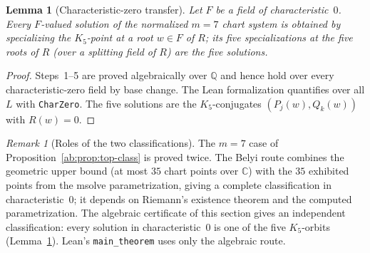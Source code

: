 \documentclass[a4paper,11pt]{article}
\theoremstyle{plain}
\newtheorem{lemma}[theorem]{Lemma}
\theoremstyle{definition}
\theoremstyle{remark}
\newtheorem{remark}[theorem]{Remark}
\begin{document}
\begin{lemma}[Characteristic-zero transfer]\label{ab:lem:chart-transfer}
Let $F$ be a field of characteristic~$0$. Every $F$-valued solution of the normalized $m=7$ chart system is obtained by specializing the $K_5$-point at a root $w\in F$ of $R$; its five specializations at the five roots of $R$ (over a splitting field of $R$) are the five solutions.
\end{lemma}
\begin{proof}
Steps~1--5 are proved algebraically over $\mathbb{Q}$ and hence hold over every characteristic-zero field by base change. The Lean formalization quantifies over all $L$ with \texttt{CharZero}. The five solutions are the $K_5$-conjugates $(P_j(w),Q_k(w))$ with $R(w)=0$.
\end{proof}

\begin{remark}[Roles of the two classifications]
The $m=7$ case of Proposition~\ref{ab:prop:top-class} is proved twice. The Belyi route combines the geometric upper bound (at most $35$ chart points over $\mathbb{C}$) with the $35$ exhibited points from the msolve parametrization, giving a complete classification in characteristic~$0$; it depends on Riemann's existence theorem and the computed parametrization. The algebraic certificate of this section gives an independent classification: every solution in characteristic~$0$ is one of the five $K_5$-orbits (Lemma~\ref{ab:lem:chart-transfer}). Lean's \texttt{main\_theorem} uses only the algebraic route.
\end{remark}
\end{document}

